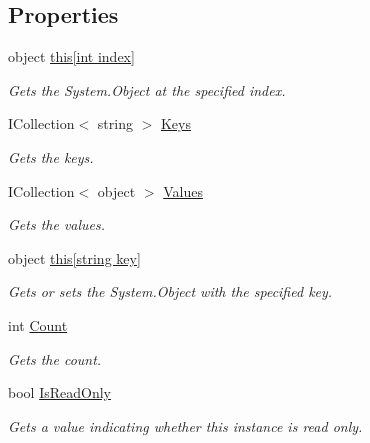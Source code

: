 \subsection*{Properties}
\begin{DoxyCompactItemize}
\item 
object \hyperlink{class_accela_1_1_windows_store_s_d_k_1_1_json_object_ad0d0d8c5f7fe70b0b92cc81b2478c864}{this\mbox{[}int index\mbox{]}}
\begin{DoxyCompactList}\small\item\em Gets the System.\+Object at the specified index. \end{DoxyCompactList}\item 
I\+Collection$<$ string $>$ \hyperlink{class_accela_1_1_windows_store_s_d_k_1_1_json_object_a9f610abba3e39b109b148884ea848fa1}{Keys}
\begin{DoxyCompactList}\small\item\em Gets the keys. \end{DoxyCompactList}\item 
I\+Collection$<$ object $>$ \hyperlink{class_accela_1_1_windows_store_s_d_k_1_1_json_object_a6781b3ba4f92736d0630aff728f55ba3}{Values}
\begin{DoxyCompactList}\small\item\em Gets the values. \end{DoxyCompactList}\item 
object \hyperlink{class_accela_1_1_windows_store_s_d_k_1_1_json_object_a4f4041ba89a5c5db23a217e899828039}{this\mbox{[}string key\mbox{]}}
\begin{DoxyCompactList}\small\item\em Gets or sets the System.\+Object with the specified key. \end{DoxyCompactList}\item 
int \hyperlink{class_accela_1_1_windows_store_s_d_k_1_1_json_object_a4988f0bf22423245a9e5595f130e825d}{Count}
\begin{DoxyCompactList}\small\item\em Gets the count. \end{DoxyCompactList}\item 
bool \hyperlink{class_accela_1_1_windows_store_s_d_k_1_1_json_object_af3891976cd147b89daa26afd105ad175}{Is\+Read\+Only}
\begin{DoxyCompactList}\small\item\em Gets a value indicating whether this instance is read only. \end{DoxyCompactList}\end{DoxyCompactItemize}



